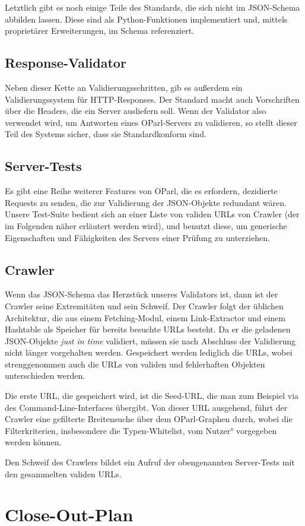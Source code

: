 \documentclass[12pt, fleqn]{scrartcl}
\begin{document}
Letztlich gibt es noch einige Teile des Standards, die sich nicht im JSON-Schema abbilden lassen. Diese sind als Python-Funktionen implementiert und, mittels proprietärer Erweiterungen, im Schema referenziert.

\subsection{Response-Validator}

Neben dieser Kette an Validierungsschritten, gib es außerdem ein Validierungssystem für HTTP-Responses. Der Standard macht auch Vorschriften über die Headers, die ein Server ausliefern soll. Wenn der Validator also verwendet wird, um Antworten eines OParl-Servers zu validieren, so stellt dieser Teil des Systems sicher, dass sie Standardkonform sind.

\subsection{Server-Tests}

Es gibt eine Reihe weiterer Features von OParl, die es erfordern, dezidierte Requests zu senden, die zur Validierung der JSON-Objekte redundant wären. Unsere Test-Suite bedient sich an einer Liste von validen URLs von Crawler (der im Folgenden näher erläutert werden wird), und benutzt diese, um generische Eigenschaften und Fähigkeiten des Servers einer Prüfung zu unterziehen.

\subsection{Crawler}


Wenn das JSON-Schema das Herzstück unseres Validators ist, dann ist der Crawler seine Extremitäten und sein Schweif. Der Crawler folgt der üblichen Architektur, die aus einem Fetching-Modul, einem Link-Extractor und einem Hashtable als Speicher für bereits besuchte URLs besteht. Da er die geladenen JSON-Objekte \emph{just in time} validiert, müssen sie nach Abschluss der Validierung nicht länger vorgehalten werden. Gespeichert werden lediglich die URLs, wobei strenggenommen auch die URLs von validen und fehlerhaften Objekten unterschieden werden.

Die erste URL, die gespeichert wird, ist die Seed-URL, die man zum Beispiel via des Command-Line-Interfaces übergibt. Von dieser URL ausgehend, führt der Crawler eine gefilterte Breitensuche über dem OParl-Graphen durch, wobei die Filterkriterien, insbesondere die Typen-Whitelist, vom Nutzer° vorgegeben werden können.

Den Schweif des Crawlers bildet ein Aufruf der obengenannten Server-Tests mit den gesammelten validen URLs.

\section{Close-Out-Plan}


{}
\setlength\bibitemsep{0pt}
\printbibliography
\end{document}
